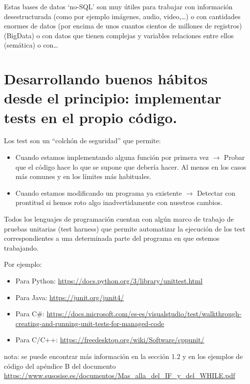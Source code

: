 \documentclass[spanish,12pt,a4paper,final,oneside]{book}
\begin{document}
Estas bases de datos `no-SQL' son muy útiles para trabajar con información desestructurada (como por ejemplo imágenes, audio, video,\ldots) o con cantidades enormes de datos (por encima de unos cuantos cientos de millones de registros)(BigData) o con datos que tienen complejas y variables relaciones entre ellos (semática) o con\ldots




\chapter{Desarrollando buenos hábitos desde el principio: implementar tests en el propio código.}

Los test son un ``colchón de seguridad'' que permite:
\begin{itemize}
\item Cuando estamos implementando alguna función por primera vez $\rightarrow$  Probar que el código hace lo que se supone que debería hacer. Al menos en los casos más comunes y en los límites más habituales.
\item Cuando estamos modificando un programa ya existente $\rightarrow$  Detectar con prontitud si hemos roto algo inadvertidamente con nuestros cambios.
\end{itemize}

Todos los lenguajes de programación cuentan con algún marco de trabajo de pruebas unitarias (test harness) que permite automatizar la ejecución de los test correspondientes a una determinada parte del programa en que estemos trabajando.

Por ejemplo:
\begin{itemize}
\item Para Python: \url{https://docs.python.org/3/library/unittest.html}
\item Para Java: \url{https://junit.org/junit4/}
\item Para C\#: \url{https://docs.microsoft.com/es-es/visualstudio/test/walkthrough-creating-and-running-unit-tests-for-managed-code}
\item Para C/C++: \url{https://freedesktop.org/wiki/Software/cppunit/}
\end{itemize}

\vspace{1cm}
nota: se puede encontrar más información en la sección 1.2 y en los ejemplos de código del apéndice B del documento \url{https://www.susosise.es/documentos/Mas_alla_del_IF_y_del_WHILE.pdf}
\end{document}
